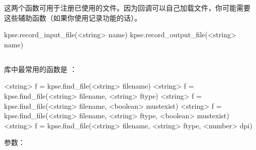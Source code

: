 这两个函数可用于注册已使用的文件。因为回调可以自己加载文件，你可能需要
这些辅助函数（如果你使用记录功能的话）。

\begin{typing}
kpse.record_input_file(<string> name)
kpse.record_output_file(<string> name)
\end{typing}

\subsection{}



库中最常用的函数是 ：

\begin{typing}
<string> f = kpse.find_file(<string> filename)
<string> f = kpse.find_file(<string> filename, <string> ftype)
<string> f = kpse.find_file(<string> filename, <boolean> mustexist)
<string> f = kpse.find_file(<string> filename, <string> ftype, <boolean> mustexist)
<string> f = kpse.find_file(<string> filename, <string> ftype, <number> dpi)
\end{typing}

参数：

